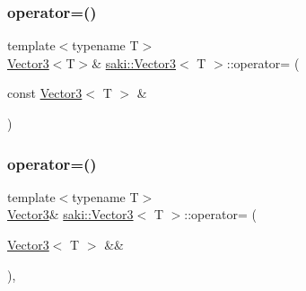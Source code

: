 \mbox{\label{classsaki_1_1_vector3_ac007820dba4edbbc1ee4cc030bc181a7}} 
\subsubsection{\texorpdfstring{operator=()}{operator=()}\hspace{0.1cm}{\footnotesize\ttfamily [1/2]}}
{\footnotesize\ttfamily template$<$typename T$>$ \\
\mbox{\hyperlink{classsaki_1_1_vector3}{Vector3}}$<$T$>$\& \mbox{\hyperlink{classsaki_1_1_vector3}{saki\+::\+Vector3}}$<$ T $>$\+::operator= (\begin{DoxyParamCaption}\item[{const \mbox{\hyperlink{classsaki_1_1_vector3}{Vector3}}$<$ T $>$ \&}]{ }\end{DoxyParamCaption})\hspace{0.3cm}{\ttfamily [default]}}

\mbox{\label{classsaki_1_1_vector3_a738dc312cb0298040193cc17b737ed08}} 
\subsubsection{\texorpdfstring{operator=()}{operator=()}\hspace{0.1cm}{\footnotesize\ttfamily [2/2]}}
{\footnotesize\ttfamily template$<$typename T$>$ \\
\mbox{\hyperlink{classsaki_1_1_vector3}{Vector3}}\& \mbox{\hyperlink{classsaki_1_1_vector3}{saki\+::\+Vector3}}$<$ T $>$\+::operator= (\begin{DoxyParamCaption}\item[{\mbox{\hyperlink{classsaki_1_1_vector3}{Vector3}}$<$ T $>$ \&\&}]{ }\end{DoxyParamCaption})\hspace{0.3cm}{\ttfamily [default]}, {\ttfamily [noexcept]}}

\mbox{\label{classsaki_1_1_vector3_ab473b7190d828bece80b0413588f6e32}} 
